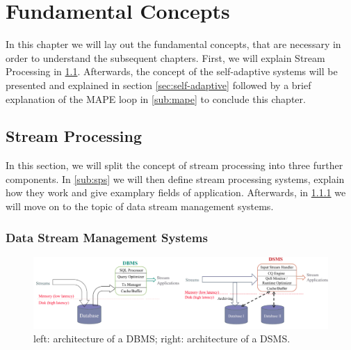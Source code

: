 \chapter{Fundamental Concepts}
\label{cha:fundamentals}
In this chapter we will lay out the fundamental concepts, that are necessary in order to understand the subsequent chapters.
First, we will explain Stream Processing in \ref{sec:stream-processing}. Afterwards, the concept of the self-adaptive systems will be presented and explained in section \ref{sec:self-adaptive} 
followed by a brief explanation of the MAPE loop in \ref{sub:mape} to conclude this chapter.

    \section{Stream Processing}
    \label{sec:stream-processing}
    In this section, we will split the concept of stream processing into three further components.
    In \ref{sub:sps} we will then define stream processing systems, explain how they work and give examplary fields of application.
    Afterwards, in \ref{sub:dsms} we will move on to the topic of data stream management systems.
    
        \subsection{Data Stream Management Systems}
        \label{sub:dsms}

        \begin{figure}[h]
            
            \centering
            \includegraphics[width=1.0\textwidth]{Bilder/dbms_dsms.png}
            \caption{
                   left: architecture of a DBMS; right: architecture of a DSMS.
            }
            \label{fig:dbms_dsms}
        \end{figure}

